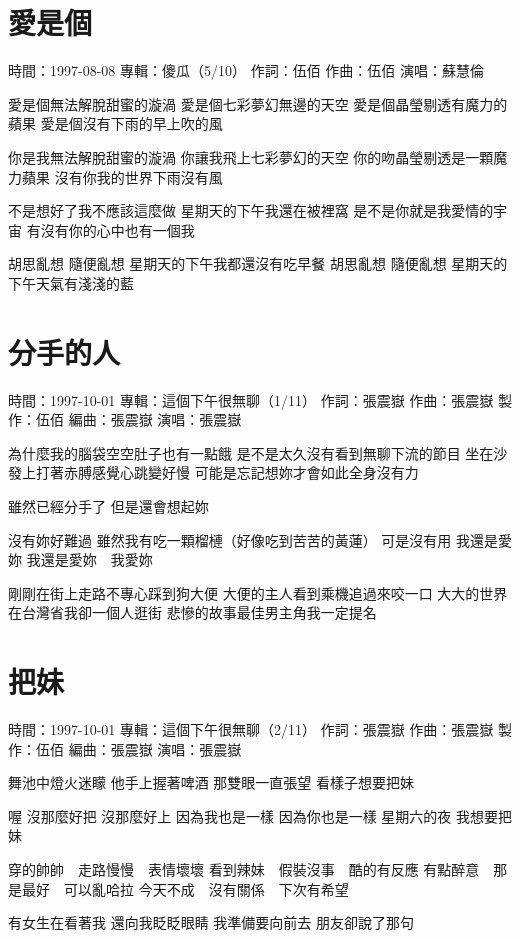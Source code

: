 \documentclass[UTF8,a4paper,oneside,twocolumn,12pt]{ctexbook}
\newcommand{\infopair}[2]{\textbullet #1：#2}
\newcommand{\zc}[1][伍佰]{\infopair{作詞}{#1}}
\newcommand{\zq}[1][伍佰]{\infopair{作曲}{#1}}
\newcommand{\bq}[1][伍佰]{\infopair{編曲}{#1}}
\newcommand{\zj}[1]{\infopair{專輯}{#1}}
\newcommand{\zz}[1]{\infopair{製作}{#1}}
\newcommand{\sj}[1]{\infopair{時間}{#1}}
\newenvironment{info}{\begin{flushleft}\kaishu
	}
	{\end{flushleft}\normalsize\yahei\par}
\newenvironment{lyric}{
	}
{}
\begin{document}
\section{愛是個}
\begin{info}
	\sj{1997-08-08}
	\zj{傻瓜（5/10）}
	\zc
	\zq
	\infopair{演唱}{蘇慧倫}
\end{info}
\begin{lyric}
	愛是個無法解脫甜蜜的漩渦
	愛是個七彩夢幻無邊的天空
	愛是個晶瑩剔透有魔力的蘋果
	愛是個沒有下雨的早上吹的風

	你是我無法解脫甜蜜的漩渦
	你讓我飛上七彩夢幻的天空
	你的吻晶瑩剔透是一顆魔力蘋果
	沒有你我的世界下雨沒有風

	不是想好了我不應該這麼做
	星期天的下午我還在被裡窩
	是不是你就是我愛情的宇宙
	有沒有你的心中也有一個我

	胡思亂想 隨便亂想 星期天的下午我都還沒有吃早餐
	胡思亂想 隨便亂想 星期天的下午天氣有淺淺的藍
\end{lyric}

\section{分手的人}
\begin{info}
	\sj{1997-10-01}
	\zj{這個下午很無聊（1/11）}
	\zc[張震嶽]
	\zq[張震嶽]
	\zz{伍佰}
	\bq[張震嶽]
	\infopair{演唱}{張震嶽}
\end{info}
\begin{lyric}
	為什麼我的腦袋空空肚子也有一點餓
	是不是太久沒有看到無聊下流的節目
	坐在沙發上打著赤膊感覺心跳變好慢
	可能是忘記想妳才會如此全身沒有力

	雖然已經分手了 但是還會想起妳

	沒有妳好難過
	雖然我有吃一顆榴槤（好像吃到苦苦的黃蓮）
	可是沒有用 我還是愛妳
	我還是愛妳　我愛妳

	剛剛在街上走路不專心踩到狗大便
	大便的主人看到乘機追過來咬一口
	大大的世界在台灣省我卻一個人逛街
	悲慘的故事最佳男主角我一定提名
\end{lyric}

\section{把妹}
\begin{info}
	\sj{1997-10-01}
	\zj{這個下午很無聊（2/11）}
	\zc[張震嶽]
	\zq[張震嶽]
	\zz{伍佰}
	\bq[張震嶽]
	\infopair{演唱}{張震嶽}
\end{info}
\begin{lyric}
	舞池中燈火迷矇 他手上握著啤酒
	那雙眼一直張望 看樣子想要把妹

	喔 沒那麼好把 沒那麼好上
	因為我也是一樣 因為你也是一樣
	星期六的夜 我想要把妹

	穿的帥帥　走路慢慢　表情壞壞
	看到辣妹　假裝沒事　酷的有反應
	有點醉意　那是最好　可以亂哈拉
	今天不成　沒有關係　下次有希望

	有女生在看著我 還向我眨眨眼睛
	我準備要向前去 朋友卻說了那句
\end{lyric}
\end{document}
